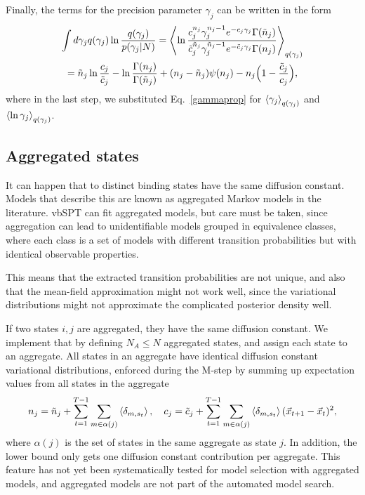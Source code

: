 Finally, the terms for the precision parameter $\gamma_j$ can be
written in the form
\begin{multline}
\int d\gamma_j q(\gamma_j)\ln\frac{q(\gamma_j)}{p(\gamma_j|N)}
=\left\langle \ln\frac{c_j^{n_j}\gamma_j^{n_j-1}e^{-c_j\gamma_j}\Gamma(\tilde n_j)}
      {\tilde c_j^{\tilde n_j}\gamma_j^{\tilde n_j-1}e^{-\tilde c_j\gamma_j}\Gamma(n_j)}\right\rangle_{q(\gamma_j)}\\
=\tilde n_j\ln\frac{c_j}{\tilde c_j}                    
-\ln\frac{\Gamma(n_j)}{\Gamma(\tilde n_j)}
+(n_j-\tilde n_j)\psi(n_j)
-n_j\Big(1-\frac{\tilde c_j}{c_j}\Big),
\end{multline}
where in the last step, we substituted Eq.~\eqref{gammaprop} for
$\left\langle \gamma_j\right\rangle_{q(\gamma_j)}$ and
$\left\langle \ln\gamma_j\right\rangle_{q(\gamma_j)}$.

\subsection{Aggregated states}
It can happen that to distinct binding states have the same diffusion
constant. Models that describe this are known as aggregated Markov
models in the
literature\cite{Fredkin1986,Kienker1989,Bruno2005,Flomenbom2006}. vbSPT
can fit aggregated models, but care must be taken, since aggregation
can lead to unidentifiable models grouped in equivalence classes, where
each class is a set of models with different transition probabilities
but with identical observable properties.

This means that the extracted transition probabilities are not unique,
and also that the mean-field approximation might not work well, since
the variational distributions might not approximate the complicated
posterior density well. 

If two states $i,j$ are aggregated, they have the same diffusion
constant. We implement that by defining $N_A\le N$ aggregated states,
and assign each state to an aggregate. All states in an aggregate have
identical diffusion constant variational distributions, enforced
during the M-step by summing up expectation values from all states in
the aggregate 
\begin{equation}
n_j=\tilde n_j+\sum_{t=1}^{T-1}\sum_{m\in \alpha(j)}\left\langle \delta_{m,s_t}\right\rangle,\quad
c_j=\tilde c_j+\sum_{t=1}^{T-1}\sum_{m\in \alpha(j)}
           \left\langle \delta_{m,s_t}\right\rangle(\vec x_{t+1}-\vec x_t)^2,
\end{equation}
where $\alpha(j)$ is the set of states in the same aggregate as state
$j$. In addition, the lower bound only gets one diffusion constant
contribution per aggregate. This feature has not yet been
systematically tested for model selection with aggregated models, and
aggregated models are not part of the automated model search.

